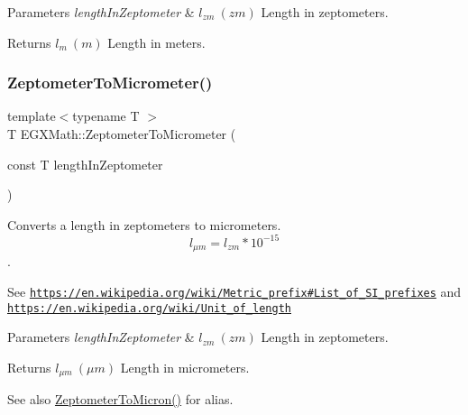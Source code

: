 \begin{DoxyParams}{Parameters}
{\em length\+In\+Zeptometer} & $ l_{zm}\ (zm)$ Length in zeptometers. \\
\hline
\end{DoxyParams}
\begin{DoxyReturn}{Returns}
$ l_{m}\ (m)$ Length in meters. 
\end{DoxyReturn}
\mbox{\label{group___e_g_x_math-_conversions-_length_conversions-_zeptometer-_s_i_ga3ff7c51338abdb80d18becf7245a32fd}} 
\subsubsection{\texorpdfstring{Zeptometer\+To\+Micrometer()}{ZeptometerToMicrometer()}}
{\footnotesize\ttfamily template$<$typename T $>$ \\
T E\+G\+X\+Math\+::\+Zeptometer\+To\+Micrometer (\begin{DoxyParamCaption}\item[{const T}]{length\+In\+Zeptometer }\end{DoxyParamCaption})}



Converts a length in zeptometers to micrometers. \[ l_{\mu m}=l_{zm} * 10^{-15} \]. 

See \href{https://en.wikipedia.org/wiki/Metric_prefix#List_of_SI_prefixes}{\tt https\+://en.\+wikipedia.\+org/wiki/\+Metric\+\_\+prefix\#\+List\+\_\+of\+\_\+\+S\+I\+\_\+prefixes} and \href{https://en.wikipedia.org/wiki/Unit_of_length}{\tt https\+://en.\+wikipedia.\+org/wiki/\+Unit\+\_\+of\+\_\+length} 
\begin{DoxyParams}{Parameters}
{\em length\+In\+Zeptometer} & $ l_{zm}\ (zm)$ Length in zeptometers. \\
\hline
\end{DoxyParams}
\begin{DoxyReturn}{Returns}
$ l_{\mu m}\ (\mu m)$ Length in micrometers. 
\end{DoxyReturn}
\begin{DoxySeeAlso}{See also}
\mbox{\hyperlink{group___e_g_x_math-_conversions-_length_conversions-_zeptometer-_non-_s_i_ga0bd42e8489b135f27530a247193286da}{Zeptometer\+To\+Micron()}} for alias. 
\end{DoxySeeAlso}
\mbox{\label{group___e_g_x_math-_conversions-_length_conversions-_zeptometer-_s_i_ga5caeffbc654c4bfc6390ed822cee42a5}} 
